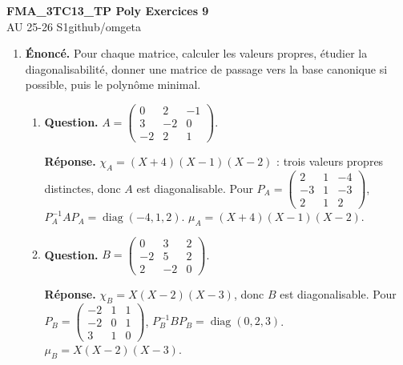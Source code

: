 \documentclass[12pt, a4paper]{article}
\newcommand{\mytitle}{FMA\_3TC13\_TP Poly Exercices 9}
\newcommand{\myauthor}{github/omgeta}
\newcommand{\mydate}{AU 25-26 S1}
\begin{document}
\raggedright
\footnotesize
\begin{center}
{\normalsize{\textbf{\mytitle}}} \\
{\footnotesize{\mydate\hspace{2pt}\textemdash\hspace{2pt}\myauthor}}
\end{center}
\begin{enumerate}[label=9.\arabic*., start=94]

  \item \begin{minipage}[t]{\linewidth}\raggedright
\textbf{Énoncé.} Pour chaque matrice, calculer les valeurs propres, étudier la diagonalisabilité, donner une matrice de passage vers la base canonique si possible, puis le polynôme minimal.

\begin{enumerate}[\arabic*.]
        \item \textbf{Question.} $\displaystyle A=\begin{pmatrix}0&2&-1\\3&-2&0\\-2&2&1\end{pmatrix}$.
\par\smallskip
\textbf{Réponse.} $\chi_A=(X+4)(X-1)(X-2)$ : trois valeurs propres distinctes, donc $A$ est diagonalisable.
        Pour $P_A=\begin{pmatrix}2&1&-4\\-3&1&-3\\2&1&2\end{pmatrix}$,
        $P_A^{-1}AP_A=\operatorname{diag}(-4,1,2)$.
        $\mu_A=(X+4)(X-1)(X-2)$.

  \item \textbf{Question.} $\displaystyle B=\begin{pmatrix}0&3&2\\-2&5&2\\2&-2&0\end{pmatrix}$.
\par\smallskip
\textbf{Réponse.} $\chi_B=X(X-2)(X-3)$, donc $B$ est diagonalisable.
        Pour $P_B=\begin{pmatrix}-2&1&1\\-2&0&1\\3&1&0\end{pmatrix}$,
        $P_B^{-1}BP_B=\operatorname{diag}(0,2,3)$.
        $\mu_B=X(X-2)(X-3)$.


\end{enumerate}
\end{minipage}
\end{enumerate}
\end{document}
